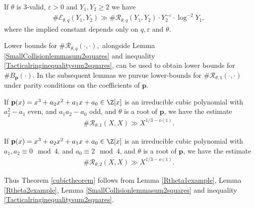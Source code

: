 \documentclass[12pt]{amsart}
\newcommand{\1}{\mathmybb{1}}
\begin{document}
\begin{lem}
\label{SmallCollisionlemmasum2squares}
If $\theta$ is 3-valid, $\varepsilon>0$ and $Y_{1},Y_{2} \geq 2$ we have
\begin{align*}
\#\mathcal{E}_{\theta,q}(Y_{1},Y_{2})\gg \#\mathcal{R}_{\theta,q}(Y_{1},Y_{2})\cdot Y_{2}^{-\varepsilon}\cdot \log^{-2}Y_{1},
\end{align*}
where the implied constant depends only on $q,\varepsilon$ and $\theta$.
\end{lem}
Lower bounds for $\#\mathcal{R}_{\theta,q}(\cdot,\cdot),$ alongside Lemma \ref{SmallCollisionlemmasum2squares} and inequality \eqref{Tacticalringinequalitysum2squares}, can be used to obtain lower bounds for $\#B_{\mathbf{p}}(\cdot)$. In the subsequent lemmas we pursue lower-bounds for $\#\mathcal{R}_{\theta,1}(\cdot,\cdot)$ under parity conditions on the coefficients of $\mathbf{p}$.
\begin{lem}
\label{Rtheta1example}
If $\mathbf{p}(x) = x^3+a_{2}x^2+a_{1}x+a_{0} \in \Z[x]$ is an irreducible cubic polynomial with $a_{2}^2-a_{1}$ even, and $a_{1}a_{2}-a_{0}$ odd, and $\theta$ is a root of $\mathbf{p}$, we have the estimate
\begin{align*}
\#\mathcal{R}_{\theta,1}(X,X) \gg X^{1/3-o(1)}.
\end{align*}
\end{lem}
\begin{lem}
\label{Rtheta2example}
If $\mathbf{p}(x) = x^3+a_{2}x^2+a_{1}x+a_{0} \in \Z[x]$ is an irreducible cubic polynomial with $a_{1},a_{2} \equiv 0 \mod 4$, and $a_{0} \equiv 2 \mod 4$, and $\theta$ is a root of $\mathbf{p}$, we have the estimate
\begin{align*}
\#\mathcal{R}_{\theta,2}(X,X) \gg X^{1/3-o(1)}.
\end{align*}
\end{lem}
Thus Theorem \ref{cubictheorem} follows from Lemma \ref{Rtheta1example}, Lemma \ref{Rtheta2example}, Lemma \ref{SmallCollisionlemmasum2squares} and inequality \eqref{Tacticalringinequalitysum2squares}.
\end{document}
